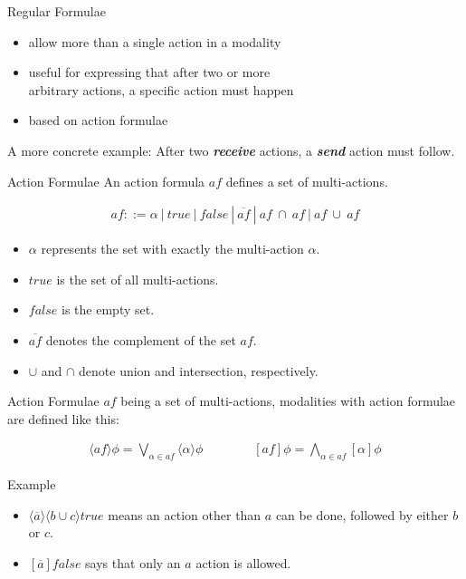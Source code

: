 \documentclass{beamer}
\begin{document}
  \begin{frame}{Regular Formulae}
    \begin{itemize}
      \item allow more than a single action in a modality
      \item useful for expressing that after two or more \\
            arbitrary actions, a specific action must happen
      \item based on action formulae
    \end{itemize}

    \begin{exampleblock}{A more concrete example:}
      After two \textit{\textbf{receive}} actions, a \textit{\textbf{send}} action must follow.
    \end{exampleblock}
  \end{frame}

  \begin{frame}{Action Formulae}
    An action formula $af$ defines a set of multi-actions.

    \begin{align*}
      af ::= \alpha\ |\ true\ |\ false\ |\ \overline{af}\ |\ af\ \cap\ af\ |\ af\ \cup\ af
    \end{align*}

    \begin{itemize}
      \item $\alpha$ represents the set with exactly the multi-action $\alpha$.
      \item $true$ is the set of all multi-actions.
      \item $false$ is the empty set.
      \item $\overline{af}$ denotes the complement of the set $af$.
      \item $\cup$ and $\cap$ denote union and intersection, respectively.
    \end{itemize}
  \end{frame}

  \begin{frame}{Action Formulae}
    $af$ being a set of multi-actions, modalities with action formulae are defined like this:

    \begin{align*}
      \langle{af}\rangle\phi = \bigvee_{\alpha \in af} \langle\alpha\rangle\phi
      \qquad\qquad
      [af]\phi = \bigwedge_{\alpha \in af} [\alpha]\phi
    \end{align*}

    \begin{exampleblock}{Example}
      \begin{itemize}
        \item $\langle\overline{a}\rangle\langle{b \cup c}\rangle{true}$ means an action other than $a$ can be done, followed by either $b$ or $c$.
        \item $[\overline{a}]false$ says that only an $a$ action is allowed.
      \end{itemize}
    \end{exampleblock}
  \end{frame}
\end{document}
